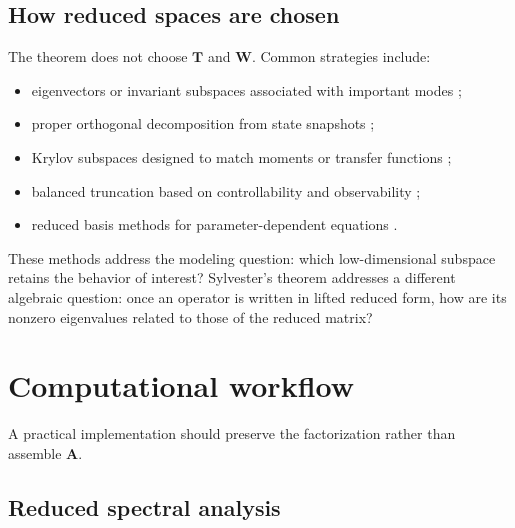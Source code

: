 \documentclass[11pt]{article}
\newcommand{\mat}[1]{\mathbf{#1}}
\theoremstyle{definition}
\theoremstyle{remark}
\begin{document}
\subsection{How reduced spaces are chosen}

The theorem does not choose \(\mat{T}\) and \(\mat{W}\). Common strategies include:
\begin{itemize}
  \item eigenvectors or invariant subspaces associated with important modes \parencite{golub2013matrix};
  \item proper orthogonal decomposition from state snapshots \parencite{benner2015survey};
  \item Krylov subspaces designed to match moments or transfer functions \parencite{antoulas2005approximation};
  \item balanced truncation based on controllability and observability \parencite{antoulas2005approximation};
  \item reduced basis methods for parameter-dependent equations \parencite{quarteroni2016reduced}.
\end{itemize}
These methods address the modeling question: which low-dimensional subspace retains the behavior of interest? Sylvester's theorem addresses a different algebraic question: once an operator is written in lifted reduced form, how are its nonzero eigenvalues related to those of the reduced matrix?

\section{Computational workflow}
\label{sec:computational-workflow}

A practical implementation should preserve the factorization rather than assemble \(\mat{A}\).

\subsection{Reduced spectral analysis}
\end{document}
